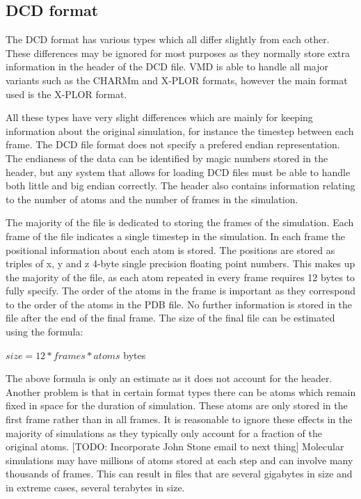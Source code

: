 \documentclass[a4paper,11pt]{report}
\begin{document}
\subsection{DCD format}
The DCD format has various types which all differ slightly from each other. These differences may be ignored for most purposes as they normally store extra information in the header of the DCD file. VMD is able to handle all major variants such as the CHARMm and X-PLOR formats, however the main format used is the X-PLOR format. \cite{vmddcdformat}

All these types have very slight differences which are mainly for keeping information about the original simulation, for instance the timestep between each frame. The DCD file format does not specify a prefered endian representation. The endianess of the data can be identified by magic numbers stored in the header, but any system that allows for loading DCD files must be able to handle both little and big endian correctly. The header also contains information relating to the number of atoms and the number of frames in the simulation.

The majority of the file is dedicated to storing the frames of the simulation. Each frame of the file indicates a single timestep in the simulation. In each frame the positional information about each atom is stored. The positions are stored as triples of x, y and z 4-byte single precision floating point numbers. This makes up the majority of the file, as each atom repeated in every frame requires 12 bytes to fully specify. The order of the atoms in the frame is important as they correspond to the order of the atoms in the PDB file. No further information is stored in the file after the end of the final frame. The size of the final file can be estimated using the formula: 

\begin{center} $size = 12*frames*atoms$ bytes\end{center}

The above formula is only an estimate as it does not account for the header. Another problem is that in certain format types there can be atoms which remain fixed in space for the duration of simulation. These atoms are only stored in the first frame rather than in all frames. It is reasonable to ignore these effects in the majority of simulations as they typically only account for a fraction of the original atoms. [TODO: Incorporate John Stone email to next thing] Molecular simulations may have millions of atoms stored at each step and can involve many thousands of frames. This can result in files that are several gigabytes in size and in extreme cases, several terabytes in size.
\end{document}
